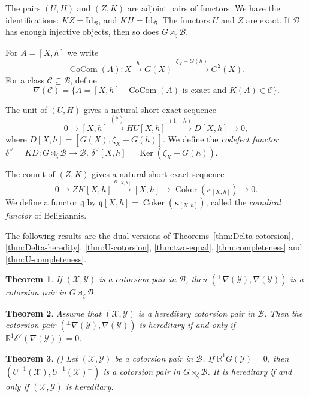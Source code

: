 \documentclass[11pt,reqno]{amsart}
\numberwithin{equation}{section}
\newtheorem{theorem}{Theorem}[section]
\newcommand{\cB}{\mathcal B}
\newcommand{\cX}{\mathcal X}
\newcommand{\cY}{\mathcal Y}
\newcommand{\cC}{\mathcal C}
\newcommand{\Coker}{\operatorname{Coker}}
\newcommand{\Ker}{\operatorname{Ker}}
\newcommand{\CoCom}{\operatorname{CoCom}}
\newcommand{\coradf}{\mathfrak q}
\begin{document}
The pairs $(U,H)$ and $(Z,K)$ are adjoint pairs of functors. We have the identifications: $KZ=\mathrm{Id}_{\cB}$, and $KH=\mathrm{Id}_{\cB}$.
The functors $U$ and $Z$ are exact.
If $\cB$ has enough injective objects, then so does $G\rtimes_\zeta \cB$.

For $A=[X,h]$ we write
\[
\CoCom(A):
X\xrightarrow{h}G(X)
\xrightarrow{\,\zeta_X-G(h)\,}G^2(X).
\]%
For a class $\cC\subseteq\cB$, define
\[
\nabla(\cC)=
\{A=[X,h]\mid \CoCom(A)\text{ is exact and }K(A)\in\cC\}.
\]

The unit of $(U,H)$ gives a natural short exact sequence
\[
0\rightarrow [X,h]\xrightarrow{\binom{h}{1}} HU[X,h] \xrightarrow{(1,-h)} D[X,h]\rightarrow 0,
\]
where $D[X,h]=[G(X),\zeta_X-G(h)]$. We define the \emph{codefect functor} $\delta^\vee=KD\colon G\rtimes_\zeta \cB\to \cB$.
$\delta^\vee[X,h]=\Ker(\zeta_X-G(h))$.

The counit of $(Z,K)$ gives a natural short exact sequence
\[
0\rightarrow ZK[X,h]\xrightarrow{\kappa_{[X,h]}} [X,h] \rightarrow \Coker(\kappa_{[X,h]})\rightarrow 0.
\]
We define a functor $\coradf$ by $\coradf[X,h]= \Coker(\kappa_{[X,h]})$, called the \emph{coradical functor} of Beligiannis.



The following results are the dual versions of Theorems~\ref{thm:Delta-cotorsion}, \ref{thm:Delta-heredity}, \ref{thm:U-cotorsion}, \ref{thm:two-equal}, \ref{thm:completeness} and \ref{thm:U-completeness}.

\begin{theorem}\label{thm:nabla-cotorsion}
If $(\cX,\cY)$ is a cotorsion pair in $\cB$, then
$
({}^\perp\nabla(\cY),\nabla(\cY))
$
is a cotorsion pair in $G\rtimes_\zeta \cB$.
\end{theorem}

\begin{theorem}\label{thm:nabla-heredity}
Assume that $(\cX,\cY)$ is a hereditary cotorsion pair in $\cB$. Then the cotorsion pair $({}^\perp\nabla(\cY),\nabla(\cY))$ is hereditary if
and only if $\mathbb{R}^1\delta^\vee(\nabla(\cY))=0$.
\end{theorem}


\begin{theorem}\label{thm:coU-cotorsion}
{\rm (\cite[Theorem 3.21]{Hu})}
Let $(\cX,\cY)$ be a cotorsion pair in $\cB$. If $\mathbb{R}^1G(\cY)=0$, then
$
(U^{-1}(\cX),U^{-1}(\cX)^\perp)
$
is a cotorsion pair in $G\rtimes_\zeta \cB$. It is hereditary if and only if $(\cX,\cY)$ is hereditary.
\end{theorem}
\end{document}
